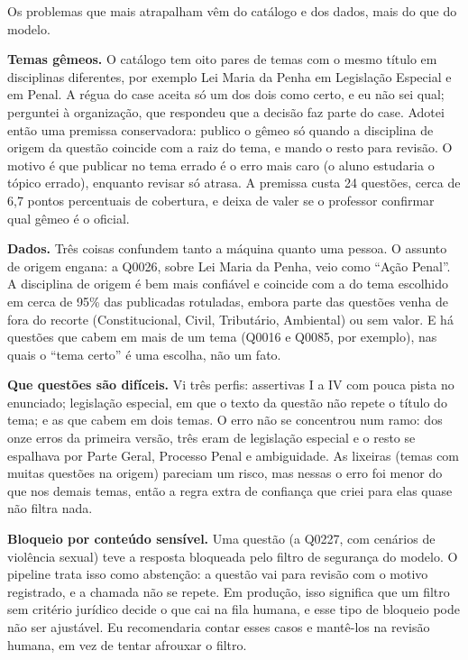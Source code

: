 \documentclass[11pt,a4paper]{article}
\newcommand{\bd}[1]{\textbf{#1}}
\begin{document}
Os problemas que mais atrapalham vêm do catálogo e dos dados, mais do que do modelo.

\bd{Temas gêmeos.} O catálogo tem oito pares de temas com o mesmo título em disciplinas
diferentes, por exemplo Lei Maria da Penha em Legislação Especial e em Penal. A régua do case
aceita só um dos dois como certo, e eu não sei qual; perguntei à organização, que respondeu
que a decisão faz parte do case. Adotei então uma premissa conservadora: publico o gêmeo só
quando a disciplina de origem da questão coincide com a raiz do tema, e mando o resto para
revisão. O motivo é que publicar no tema errado é o erro mais caro (o aluno estudaria o tópico
errado), enquanto revisar só atrasa. A premissa custa 24 questões, cerca de 6,7 pontos
percentuais de cobertura, e deixa de valer se o professor confirmar qual gêmeo é o oficial.

\bd{Dados.} Três coisas confundem tanto a máquina quanto uma pessoa. O assunto de origem
engana: a Q0026, sobre Lei Maria da Penha, veio como ``Ação Penal''. A disciplina de origem é
bem mais confiável e coincide com a do tema escolhido em cerca de 95\% das publicadas
rotuladas, embora parte das questões venha de fora do recorte (Constitucional, Civil,
Tributário, Ambiental) ou sem valor. E há questões que cabem em mais de um tema (Q0016 e
Q0085, por exemplo), nas quais o ``tema certo'' é uma escolha, não um fato.

\bd{Que questões são difíceis.} Vi três perfis: assertivas I a IV com pouca pista no
enunciado; legislação especial, em que o texto da questão não repete o título do tema; e as
que cabem em dois temas. O erro não se concentrou num ramo: dos onze erros da primeira
versão, três eram de legislação especial e o resto se espalhava por Parte Geral, Processo
Penal e ambiguidade. As lixeiras (temas com muitas questões na origem) pareciam um risco, mas
nessas o erro foi menor do que nos demais temas, então a regra extra de confiança que criei
para elas quase não filtra nada.

\bd{Bloqueio por conteúdo sensível.} Uma questão (a Q0227, com cenários de violência sexual)
teve a resposta bloqueada pelo filtro de segurança do modelo. O pipeline trata isso como
abstenção: a questão vai para revisão com o motivo registrado, e a chamada não se repete. Em
produção, isso significa que um filtro sem critério jurídico decide o que cai na fila humana,
e esse tipo de bloqueio pode não ser ajustável. Eu recomendaria contar esses casos e
mantê-los na revisão humana, em vez de tentar afrouxar o filtro.
\end{document}
